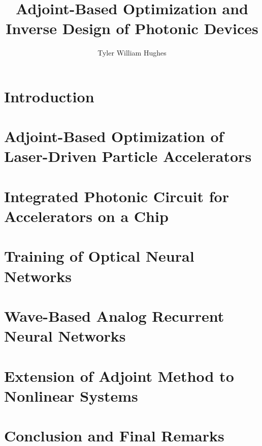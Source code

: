 \documentclass{report}
\begin{document}
\title{Adjoint-Based Optimization and Inverse Design of Photonic Devices}

\author{Tyler William Hughes}

 
\beforepreface
{}


\afterpreface




\chapter{Introduction}


\chapter{Adjoint-Based Optimization of Laser-Driven Particle Accelerators}


\chapter{Integrated Photonic Circuit for Accelerators on a Chip}


\chapter{Training of Optical Neural Networks}


\chapter{Wave-Based Analog Recurrent Neural Networks}


\chapter{Extension of Adjoint Method to Nonlinear Systems}


\chapter{Conclusion and Final Remarks}

\end{document}
